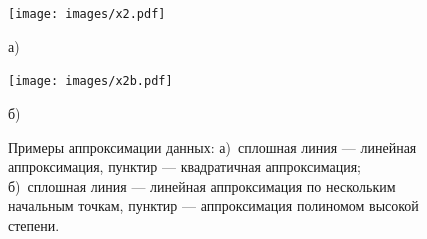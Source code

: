 \begin{figure}[h]
\begin{minipage}[t]{0.49\columnwidth}%
\begin{center}
\texttt{[image: images/x2.pdf]}
\par\end{center}
\begin{center}
а)
\par\end{center}%
\end{minipage}%
\begin{minipage}[t]{0.49\columnwidth}%
\begin{center}
\texttt{[image: images/x2b.pdf]}
\par\end{center}
\begin{center}
б)
\par\end{center}%
\end{minipage}
\caption{\label{fig:approx}Примеры аппроксимации данных: а)~сплошная линия
--- линейная аппроксимация, пунктир --- квадратичная
аппроксимация; б)~сплошная линия --- линейная аппроксимация
по нескольким начальным точкам, пунктир --- аппроксимация
полиномом высокой степени.}
\end{figure}

